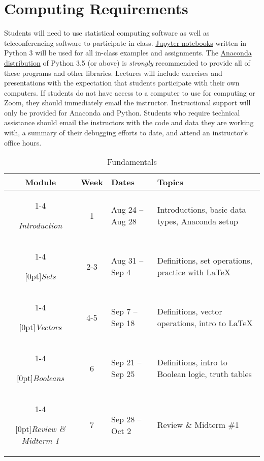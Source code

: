 \documentclass[10pt]{memoir}
\begin{document}
\section{\textbf{Computing Requirements}}
Students will need to use statistical computing software as well as teleconferencing software to participate in class. \href{http://jupyter.org/}{Jupyter notebooks} written in Python 3 will be used for all in-class examples and assignments. The \href{https://www.continuum.io/why-anaconda}{Anaconda distribution} of Python 3.5 (or above) is \textit{strongly} recommended to provide all of these programs and other libraries. Lectures will include exercises and presentations with the expectation that students participate with their own computers. If students do not have access to a computer to use for computing or Zoom, they should immediately email the instructor. Instructional support will only be provided for Anaconda and Python. Students who require technical assistance should email the instructors with the code and data they are working with, a summary of their debugging efforts to date, and attend an instructor's office hours.

\clearpage

\vspace{2em}

\begin{table}[h]
\centering
\begin{tabular}{ccll}
    \toprule[.15em]
    \textbf{Module} & \textbf{Week} & \textbf{Dates} & \textbf{Topics} \\
    \cmidrule[.1em](lr){1-4}
    
    \textit{Introduction} & 1 & Aug 24 -- Aug 28 & Introductions, basic data types, Anaconda setup \\
    \cmidrule[.1em](lr){1-4} 
 
     \multirow{1}{*}[0pt]{\textit{Sets}} %
        & 2-3 & Aug 31 -- Sep 4 & Definitions, set operations, practice with \LaTeX \\ 
        \cmidrule[.1em](lr){1-4}
        
    \multirow{1}{*}[0pt]{\textit{Vectors}} %
        & 4-5 & Sep 7 -- Sep 18 & Definitions, vector operations, intro to  \LaTeX  \\ \cmidrule[.1em](lr){1-4}

    \multirow{1}{*}[0pt]{\textit{Booleans}} %
        & 6 & Sep 21 -- Sep 25 & Definitions, intro to Boolean logic, truth tables \\   \cmidrule[.1em](lr){1-4}    

   \multirow{1}{*}[0pt]{\textit{Review \& Midterm 1}} %
        & 7 & Sep 28 -- Oct 2 & Review \& Midterm \#1 \\         
      
    \bottomrule[.15em]
\end{tabular}\\
\caption{Fundamentals}
\end{table}
\end{document}
